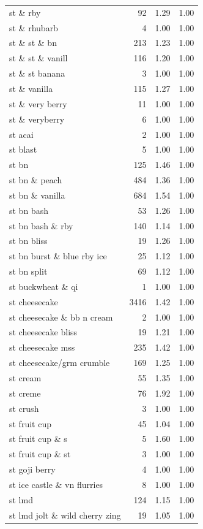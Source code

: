 \begin{table}
\begin{tabular}{lrrr}
st \& rby & 92 & 1.29 & 1.00 \\
st \& rhubarb & 4 & 1.00 & 1.00 \\
st \& st \& bn & 213 & 1.23 & 1.00 \\
st \& st \& vanill & 116 & 1.20 & 1.00 \\
st \& st banana & 3 & 1.00 & 1.00 \\
st \& vanilla & 115 & 1.27 & 1.00 \\
st \& very berry & 11 & 1.00 & 1.00 \\
st \& veryberry & 6 & 1.00 & 1.00 \\
st acai & 2 & 1.00 & 1.00 \\
st blast & 5 & 1.00 & 1.00 \\
st bn & 125 & 1.46 & 1.00 \\
st bn \& peach & 484 & 1.36 & 1.00 \\
st bn \& vanilla & 684 & 1.54 & 1.00 \\
st bn bash & 53 & 1.26 & 1.00 \\
st bn bash \& rby & 140 & 1.14 & 1.00 \\
st bn bliss & 19 & 1.26 & 1.00 \\
st bn burst \& blue rby ice & 25 & 1.12 & 1.00 \\
st bn split & 69 & 1.12 & 1.00 \\
st buckwheat \& qi & 1 & 1.00 & 1.00 \\
st cheesecake & 3416 & 1.42 & 1.00 \\
st cheesecake \& bb n cream & 2 & 1.00 & 1.00 \\
st cheesecake bliss & 19 & 1.21 & 1.00 \\
st cheesecake mss & 235 & 1.42 & 1.00 \\
st cheesecake/grm crumble & 169 & 1.25 & 1.00 \\
st cream & 55 & 1.35 & 1.00 \\
st creme & 76 & 1.92 & 1.00 \\
st crush & 3 & 1.00 & 1.00 \\
st fruit cup & 45 & 1.04 & 1.00 \\
st fruit cup \& s & 5 & 1.60 & 1.00 \\
st fruit cup \& st & 3 & 1.00 & 1.00 \\
st goji berry & 4 & 1.00 & 1.00 \\
st ice castle \& vn flurries & 8 & 1.00 & 1.00 \\
st lmd & 124 & 1.15 & 1.00 \\
st lmd jolt \& wild cherry zing & 19 & 1.05 & 1.00 \\

\end{tabular}
\end{table}
